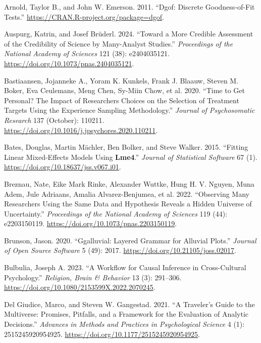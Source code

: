 \documentclass[
  letterpaper,
  DIV=11,
  numbers=noendperiod]{scrartcl}
\newlength{\cslhangindent}
\newenvironment{CSLReferences}[2] %
 {\begin{list}{}{%
  \setlength{\itemindent}{0pt}
  \setlength{\leftmargin}{0pt}
  \setlength{\parsep}{0pt}
  \ifodd #1
   \setlength{\leftmargin}{\cslhangindent}
   \setlength{\itemindent}{-1\cslhangindent}
  \fi
  \setlength{\itemsep}{#2\baselineskip}}}
 {\end{list}}
\begin{document}
\label{refs}
\begin{CSLReferences}{1}{0}
Arnold, Taylor B., and John W. Emerson. 2011. {``Dgof: {Discrete}
{Goodness}-of-{Fit} {Tests}.''}
\url{https://CRAN.R-project.org/package=dgof}.

Auspurg, Katrin, and Josef Brüderl. 2024. {``Toward a More Credible
Assessment of the Credibility of Science by Many-Analyst Studies.''}
\emph{Proceedings of the National Academy of Sciences} 121 (38):
e2404035121. \url{https://doi.org/10.1073/pnas.2404035121}.

Bastiaansen, Jojanneke A., Yoram K. Kunkels, Frank J. Blaauw, Steven M.
Boker, Eva Ceulemans, Meng Chen, Sy-Miin Chow, et al. 2020. {``Time to
Get Personal? {The} Impact of Researchers Choices on the Selection of
Treatment Targets Using the Experience Sampling Methodology.''}
\emph{Journal of Psychosomatic Research} 137 (October): 110211.
\url{https://doi.org/10.1016/j.jpsychores.2020.110211}.

Bates, Douglas, Martin Mächler, Ben Bolker, and Steve Walker. 2015.
{``Fitting {Linear} {Mixed}-{Effects} {Models} {Using} \textbf{Lme4}.''}
\emph{Journal of Statistical Software} 67 (1).
\url{https://doi.org/10.18637/jss.v067.i01}.

Breznau, Nate, Eike Mark Rinke, Alexander Wuttke, Hung H. V. Nguyen,
Muna Adem, Jule Adriaans, Amalia Alvarez-Benjumea, et al. 2022.
{``Observing Many Researchers Using the Same Data and Hypothesis Reveals
a Hidden Universe of Uncertainty.''} \emph{Proceedings of the National
Academy of Sciences} 119 (44): e2203150119.
\url{https://doi.org/10.1073/pnas.2203150119}.

Brunson, Jason. 2020. {``Ggalluvial: {Layered} {Grammar} for {Alluvial}
{Plots}.''} \emph{Journal of Open Source Software} 5 (49): 2017.
\url{https://doi.org/10.21105/joss.02017}.

Bulbulia, Joseph A. 2023. {``A Workflow for Causal Inference in
Cross-Cultural Psychology.''} \emph{Religion, Brain \& Behavior} 13 (3):
291--306. \url{https://doi.org/10.1080/2153599X.2022.2070245}.

Del Giudice, Marco, and Steven W. Gangestad. 2021. {``A {Traveler}'s
{Guide} to the {Multiverse}: {Promises}, {Pitfalls}, and a {Framework}
for the {Evaluation} of {Analytic} {Decisions}.''} \emph{Advances in
Methods and Practices in Psychological Science} 4 (1): 2515245920954925.
\url{https://doi.org/10.1177/2515245920954925}.


\end{CSLReferences}
\end{document}
